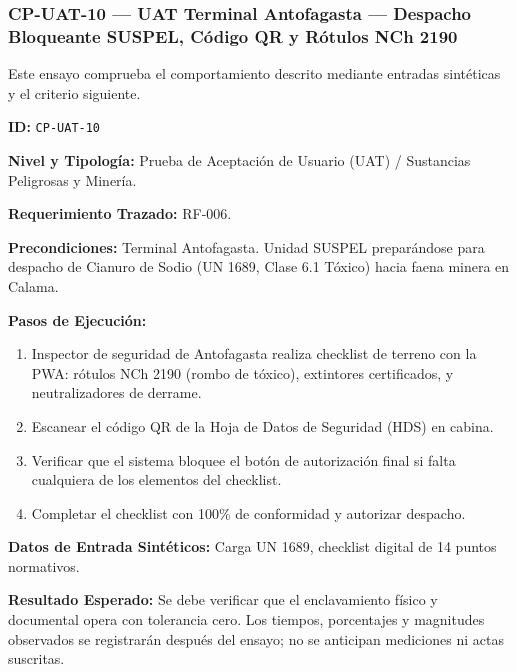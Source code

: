 \subsubsection*{CP-UAT-10 — UAT Terminal Antofagasta — Despacho Bloqueante SUSPEL, Código QR y Rótulos NCh 2190}\label{sec:9-cp-uat-10}
Este ensayo comprueba el comportamiento descrito mediante entradas sintéticas y el criterio siguiente.

\par\noindent\textbf{ID:} \texttt{C\allowbreak{}P\allowbreak{}-\allowbreak{}U\allowbreak{}A\allowbreak{}T\allowbreak{}-\allowbreak{}1\allowbreak{}0\allowbreak{}}\par
\par\noindent\textbf{Nivel y Tipología:} Prueba de Aceptación de Usuario (UAT) / Sustancias Peligrosas y Minería.\par
\par\noindent\textbf{Requerimiento Trazado:} RF-006.\par
\par\noindent\textbf{Precondiciones:} Terminal Antofagasta. Unidad SUSPEL preparándose para despacho de Cianuro de Sodio (UN 1689, Clase 6.1 Tóxico) hacia faena minera en Calama.\par
\par\noindent\textbf{Pasos de Ejecución:} \par
\begin{enumerate}
\item Inspector de seguridad de Antofagasta realiza checklist de terreno con la PWA: rótulos NCh 2190 (rombo de tóxico), extintores certificados, y neutralizadores de derrame.
\item Escanear el código QR de la Hoja de Datos de Seguridad (HDS) en cabina.
\item Verificar que el sistema bloquee el botón de autorización final si falta cualquiera de los elementos del checklist.
\item Completar el checklist con 100\% de conformidad y autorizar despacho.
\end{enumerate}
\par\noindent\textbf{Datos de Entrada Sintéticos:} Carga UN 1689, checklist digital de 14 puntos normativos.\par
\par\noindent\textbf{Resultado Esperado:} Se debe verificar que el enclavamiento físico y documental opera con tolerancia cero. Los tiempos, porcentajes y magnitudes observados se registrarán después del ensayo; no se anticipan mediciones ni actas suscritas.\par
